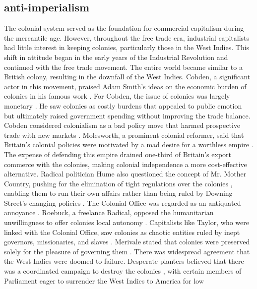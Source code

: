 \subsection{anti-imperialism}
The colonial system served as the foundation for commercial capitalism during the mercantile age. However, throughout the free trade era, industrial capitalists had little interest in keeping colonies, particularly those in the West Indies. This shift in attitude began in the early years of the Industrial Revolution and continued with the free trade movement. The entire world became similar to a British colony, resulting in the downfall of the West Indies. Cobden, a significant actor in this movement, praised Adam Smith's ideas on the economic burden of colonies in his famous work . For Cobden, the issue of colonies was largely monetary . He saw colonies as costly burdens that appealed to public emotion but ultimately raised government spending without improving the trade balance. Cobden considered colonialism as a bad policy move that harmed prospective trade with new markets . Molesworth, a prominent colonial reformer, said that Britain's colonial policies were motivated by a mad desire for a worthless empire . The expense of defending this empire drained one-third of Britain's export commerce with the colonies, making colonial independence a more cost-effective alternative. Radical politician Hume also questioned the concept of Mr. Mother Country, pushing for the elimination of tight regulations over the colonies , enabling them to run their own affairs rather than being ruled by Downing Street's changing policies . The Colonial Office was regarded as an antiquated annoyance . Roebuck, a freelance Radical, opposed the humanitarian unwillingness to offer colonies local autonomy . Capitalists like Taylor, who were linked with the Colonial Office, saw colonies as chaotic entities ruled by inept governors, missionaries, and slaves . Merivale stated that colonies were preserved solely for the pleasure of governing them . There was widespread agreement that the West Indies were doomed to failure. Desperate planters believed that there was a coordinated campaign to destroy the colonies , with certain members of Parliament eager to surrender the West Indies to America for low 
